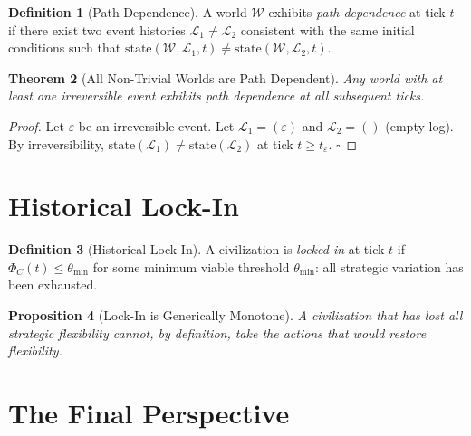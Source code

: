 \documentclass[11pt,a4paper,openany]{book}
\theoremstyle{plain}
\newtheorem{theorem}{Theorem}[chapter]
\newtheorem{proposition}[theorem]{Proposition}
\theoremstyle{definition}
\newtheorem{definition}[theorem]{Definition}
\theoremstyle{remark}
\newcommand{\world}{\ensuremath{\mathcal{W}}}
\begin{document}
\begin{definition}[Path Dependence]
  A world $\world$ exhibits \emph{path dependence} at tick $t$ if there
  exist two event histories $\mathcal{L}_1 \neq \mathcal{L}_2$ consistent
  with the same initial conditions such that
  $\mathrm{state}(\world, \mathcal{L}_1, t) \neq
  \mathrm{state}(\world, \mathcal{L}_2, t)$.
\end{definition}

\begin{theorem}[All Non-Trivial Worlds are Path Dependent]
  Any world with at least one irreversible event exhibits path dependence
  at all subsequent ticks.
\end{theorem}
\begin{proof}
  Let $\varepsilon$ be an irreversible event. Let
  $\mathcal{L}_1 = (\varepsilon)$ and $\mathcal{L}_2 = ()$ (empty log).
  By irreversibility, $\mathrm{state}(\mathcal{L}_1) \neq
  \mathrm{state}(\mathcal{L}_2)$ at tick $t \geq t_\varepsilon$.
  $\square$
\end{proof}

\section{Historical Lock-In}

\begin{definition}[Historical Lock-In]
  A civilization is \emph{locked in} at tick $t$ if
  $\Phi_C(t) \leq \theta_{\min}$ for some minimum viable threshold
  $\theta_{\min}$: all strategic variation has been exhausted.
\end{definition}

\begin{proposition}[Lock-In is Generically Monotone]
  A civilization that has lost all strategic flexibility cannot, by
  definition, take the actions that would restore flexibility.
\end{proposition}

\section{The Final Perspective}
\end{document}
